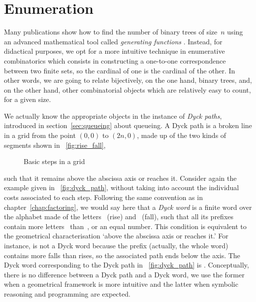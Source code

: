 \section{Enumeration}

Many publications \cite[\S~2.3.4.4]{Knuth_1997}
\cite[\S~5.1]{SedgewickFlajolet_1996} show how to find the number of
binary trees of size~\(n\) using an advanced mathematical tool called
\emph{generating functions} \cite[chap.~7]{GrahamKnuthPatashnik_1994}. Instead, for
didactical purposes, we opt for a more intuitive technique in
enumerative combinatorics which
consists in constructing a one\hyp{}to\hyp{}one correspondence between
two finite sets, so the cardinal of one is the cardinal of the
other. In other words, we are going to relate bijectively, on the one
hand, binary trees, and, on the other hand, other combinatorial
objects which are relatively easy to count, for a given size.

We actually know the appropriate objects in the instance of \emph{Dyck
  paths}, introduced in section~\ref{sec:queueing}
about queueing. A Dyck path is a broken line in a grid
from the point \((0,0)\) to \((2n,0)\), made up of the two kinds of
segments shown in \fig~\vref{fig:rise_fall},
\begin{figure}[b]
\centering
{}
\qquad
{}
\caption{Basic steps in a grid}
\label{fig:rise_fall}
\end{figure}
such that it remains above the abscissa axis or reaches it. Consider
again the example given in \fig~\vref{fig:dyck_path}, without taking
into account the individual costs associated to each step. Following
the same convention as in chapter~\ref{chap:factoring}, we would say
here that a \emph{Dyck word} is a
finite word over the alphabet made of the letters~
(rise) and~ (fall),
such that all its prefixes contain more
letters~ than~, or an equal number. This condition is
equivalent to the geometrical characterisation `above the abscissa
axis or reaches it.' For instance,  is not a Dyck word
because the prefix  (actually, the whole word) contains more
falls than rises, so the associated path ends below the axis. The Dyck
word corresponding to the Dyck path in \fig~\vref{fig:dyck_path} is
. Conceptually, there is no difference between a
Dyck path and a Dyck word, we use the former when a geometrical
framework is more intuitive and the latter when symbolic reasoning and
programming are expected.

